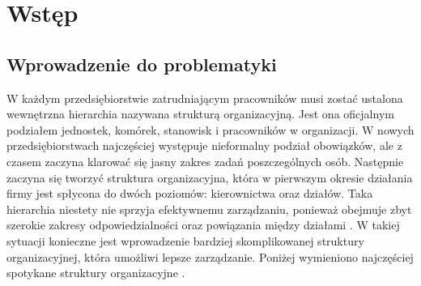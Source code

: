 
\chapter{Wstęp}
\label{ch:wstep}

\section{Wprowadzenie do problematyki}

W każdym przedsiębiorstwie zatrudniającym pracowników musi zostać ustalona wewnętrzna hierarchia nazywana strukturą organizacyjną. Jest ona oficjalnym podziałem jednostek, komórek, stanowisk i pracowników w organizacji. W nowych przedsiębiorstwach najczęściej występuje nieformalny podział obowiązków, ale z czasem zaczyna klarować się jasny zakres zadań poszczególnych osób. Następnie zaczyna się tworzyć struktura organizacyjna, która w pierwszym okresie działania firmy jest spłycona do dwóch poziomów: kierownictwa oraz działów. Taka hierarchia niestety nie sprzyja efektywnemu zarządzaniu, ponieważ obejmuje zbyt szerokie zakresy odpowiedzialności oraz powiązania między działami \cite{bib:zarzadzanie}. W takiej sytuacji konieczne jest wprowadzenie bardziej skomplikowanej struktury organizacyjnej, która umożliwi lepsze zarządzanie. Poniżej wymieniono najczęściej spotykane struktury organizacyjne \cite{bib:StrukturaOrganizacyjna}.


